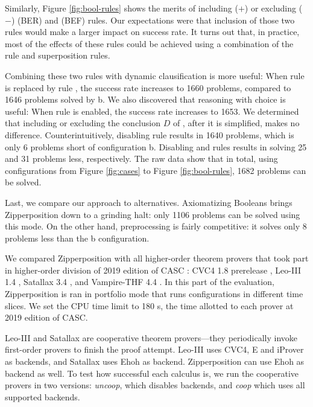Similarly, Figure \ref{fig:bool-rules} shows the merits of including ($+$) or
excluding ($-$)  (BER) and  (BEF) rules. Our
expectations were that inclusion of those two rules would make a larger impact on
success rate. It turns out that, in practice, most of the effects of these
rules could be achieved using a combination of the  rule and
superposition rules.
\pagebreak[2]

Combining these two rules with dynamic clausification is more useful: When rule
 is replaced by rule , the success rate increases
to 1660 problems, compared to 1646 problems solved by b. We also discovered
that reasoning with choice is useful: When rule  is enabled, the
success rate increases to 1653. We determined that including or excluding the
conclusion $D$ of , after it is simplified, makes no difference.
Counterintuitively, disabling  rule results in 1640 problems,
which is only 6 problems short of configuration b. Disabling  and
 rules results in solving 25 and 31 problems less,
respectively. The raw data show that in total, using configurations from Figure
\ref{fig:cases} to Figure \ref{fig:bool-rules}, 1682 problems can be solved.

Last, we compare our approach to alternatives. Axiomatizing Booleans brings
Zipperposition down to a grinding halt: only 1106 problems can be solved using
this mode. On the other hand, preprocessing is fairly competitive: it solves
only 8 problems less than the b configuration.



We compared Zipperposition with all higher-order theorem provers that took part
in higher-order division of 2019 edition of CASC \cite{gs-19-casc27}: CVC4 1.8 prerelease \cite{cbetal-11-cvc4},
Leo-III 1.4 \cite{sb-21-leo3}, Satallax 3.4
\cite{cb-12-satallax}, and Vampire-THF 4.4
\cite{lkav-13-vampire}. In this part of the evaluation, Zipperposition is ran
in portfolio mode that runs configurations in different time slices. 
We set the CPU time limit to 180 s, the time allotted to each prover at 2019 edition of CASC.


Leo-III and Satallax are cooperative theorem provers---they periodically invoke
first-order provers to finish the proof attempt. Leo-III uses CVC4, E and
iProver \cite{kk-08-iprover} as backends, and Satallax uses Ehoh
 as backend. Zipperposition can use Ehoh as backend as well. To test how successful each calculus is, we run
the cooperative provers in two versions: \emph{uncoop}, which disables backends,
and \emph{coop} which uses all supported backends.



